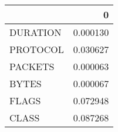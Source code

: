 \begin{tabular}{lr}
\toprule
{} &         0 \\
\midrule
DURATION &  0.000130 \\
PROTOCOL &  0.030627 \\
PACKETS  &  0.000063 \\
BYTES    &  0.000067 \\
FLAGS    &  0.072948 \\
CLASS    &  0.087268 \\
\bottomrule
\end{tabular}
